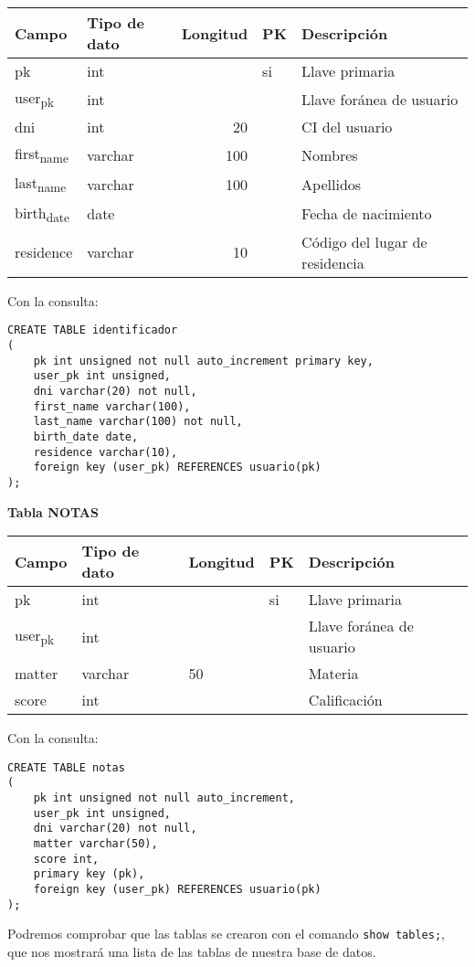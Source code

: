 \documentclass[letter]{article}
\begin{document}
\begin{center}
\begin{tabular}{llrll}
Campo & Tipo de dato & Longitud & PK & Descripción\\
\hline
pk & int &  & si & Llave primaria\\
user\textsubscript{pk} & int &  &  & Llave foránea de usuario\\
dni & int & 20 &  & CI del usuario\\
first\textsubscript{name} & varchar & 100 &  & Nombres\\
last\textsubscript{name} & varchar & 100 &  & Apellidos\\
birth\textsubscript{date} & date &  &  & Fecha de nacimiento\\
residence & varchar & 10 &  & Código del lugar de residencia\\
\end{tabular}
\end{center}

Con la consulta:

\begin{verbatim}
CREATE TABLE identificador
(
    pk int unsigned not null auto_increment primary key,
    user_pk int unsigned,
    dni varchar(20) not null,
    first_name varchar(100),
    last_name varchar(100) not null,
    birth_date date,
    residence varchar(10),
    foreign key (user_pk) REFERENCES usuario(pk)
);
\end{verbatim}

\textbf{Tabla NOTAS}

\begin{center}
\begin{tabular}{lllll}
Campo & Tipo de dato & Longitud & PK & Descripción\\
\hline
pk & int &  & si & Llave primaria\\
user\textsubscript{pk} & int &  &  & Llave foránea de usuario\\
matter & varchar & 50 &  & Materia\\
score & int &  &  & Calificación\\
\end{tabular}
\end{center}

Con la consulta:

\begin{verbatim}
CREATE TABLE notas
(
    pk int unsigned not null auto_increment,
    user_pk int unsigned,
    dni varchar(20) not null,
    matter varchar(50),
    score int,
    primary key (pk),
    foreign key (user_pk) REFERENCES usuario(pk)
);
\end{verbatim}

Podremos comprobar que las tablas se crearon con el comando \texttt{show tables;}, que
nos mostrará una lista de las tablas de nuestra base de datos.
\end{document}
